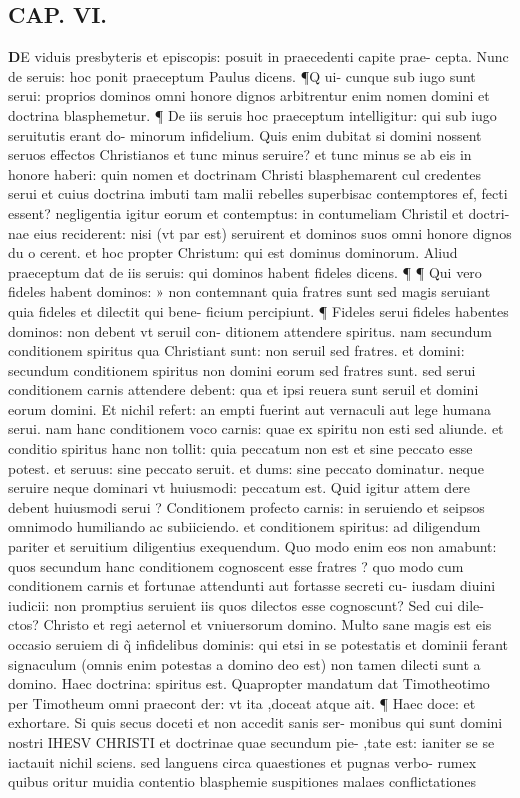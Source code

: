 \documentclass{article}
\begin{document}
\begin{pages}
\endnumbering\beginnumbering\section{CAP. VI.}\pstart \huge\textbf{D}\normalsize E viduis presbyteris et episcopis: posuit in praecedenti capite prae- cepta. Nunc de seruis: hoc ponit praeceptum Paulus dicens. ¶Q ui- cunque sub iugo sunt serui: proprios dominos omni honore dignos arbitrentur enim nomen domini et doctrina blasphemetur. ¶ De iis seruis hoc praeceptum intelligitur: qui sub iugo seruitutis erant do- minorum infidelium. Quis enim dubitat si domini nossent seruos effectos Christianos et tunc minus seruire? et tunc minus se ab eis in honore haberi: quin nomen et doctrinam Christi blasphemarent cul credentes serui et cuius doctrina imbuti tam malii rebelles superbisac contemptores ef, fecti essent? negligentia igitur eorum et contemptus: in contumeliam Christil et doctri- nae eius reciderent: nisi (vt par est) seruirent et dominos suos omni honore dignos du o cerent. et hoc propter Christum: qui est dominus dominorum. Aliud praeceptum dat de  iis seruis: qui dominos habent fideles dicens. ¶ ¶ Qui vero fideles habent dominos: » non contemnant quia fratres sunt sed magis seruiant quia fideles et dilectit qui bene-  ficium percipiunt. ¶ Fideles serui fideles habentes dominos: non debent vt seruil con- ditionem attendere spiritus. nam secundum conditionem spiritus qua Christiant sunt: non seruil sed fratres. et domini: secundum conditionem spiritus non domini eorum sed fratres sunt. sed serui conditionem carnis attendere debent: qua et ipsi reuera sunt seruil et domini eorum domini. Et nichil refert: an empti fuerint aut vernaculi aut lege humana serui. nam hanc conditionem voco carnis: quae ex spiritu non esti sed aliunde. et conditio spiritus hanc non tollit: quia peccatum non est et sine peccato esse potest. et seruus: sine peccato seruit. et dums: sine peccato dominatur. neque seruire neque dominari vt huiusmodi: peccatum est. Quid igitur attem dere debent huiusmodi serui ? Conditionem profecto carnis: in seruiendo et seipsos omnimodo humiliando ac subiiciendo. et conditionem spiritus: ad diligendum pariter et seruitium diligentius exequendum. Quo modo enim eos non amabunt: quos secundum hanc conditionem cognoscent esse fratres ? quo modo cum conditionem carnis et fortunae attendunti aut fortasse secreti cu- iusdam diuini iudicii: non promptius seruient iis quos dilectos esse cognoscunt? Sed cui dile- ctos? Christo et regi aeternol et vniuersorum domino. Multo sane magis est eis occasio seruiem di q̃ infidelibus dominis: qui etsi in se potestatis et dominii ferant signaculum (omnis enim potestas a domino deo est) non tamen dilecti sunt a domino. Haec doctrina: spiritus est. Quapropter mandatum dat Timotheotimo per Timotheum omni praecont der: vt ita ,doceat atque ait. ¶ Haec doce: et exhortare. Si quis secus doceti et non accedit sanis ser- monibus qui sunt domini nostri IHESV CHRISTI et doctrinae quae secundum pie- ,tate est: ianiter se se iactauit nichil sciens. sed languens circa quaestiones et pugnas verbo-  rumex quibus oritur muidia contentio blasphemie suspitiones malaes conflictationes  \pend

\end{pages}
\end{document}
